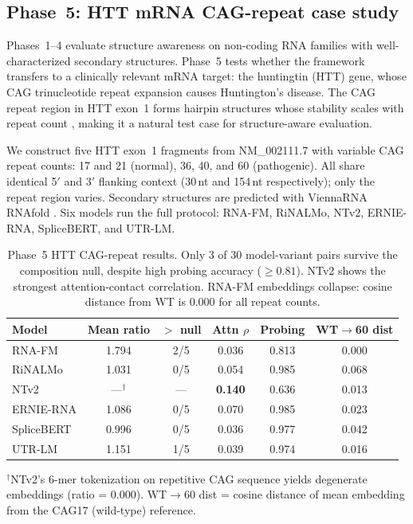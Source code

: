 \documentclass[11pt]{article}
\begin{document}
\subsection{Phase~5: HTT mRNA CAG-repeat case study}
\label{sec:phase5}

Phases~1--4 evaluate structure awareness on non-coding RNA families
with well-characterized secondary structures.  Phase~5 tests
whether the framework transfers to a clinically relevant mRNA target:
the huntingtin (HTT) gene, whose CAG trinucleotide repeat expansion
causes Huntington's disease.  The CAG repeat region in HTT exon~1
forms hairpin structures whose stability scales with repeat count
\citep{demezer2011mutant,krzyzosiak2012triplet}, making it a natural
test case for structure-aware evaluation.

We construct five HTT exon~1 fragments from NM\_002111.7 with
variable CAG repeat counts: 17 and 21 (normal), 36, 40, and 60
(pathogenic).  All share identical 5$'$ and 3$'$ flanking context
(30\,nt and 154\,nt respectively); only the repeat region varies.
Secondary structures are predicted with ViennaRNA RNAfold
\citep{lorenz2011viennarna}.  Six models run the full protocol:
RNA-FM, RiNALMo, NTv2, ERNIE-RNA, SpliceBERT, and UTR-LM.

\begin{table}[t]
\centering
\caption{Phase~5 HTT CAG-repeat results.  Only 3 of 30
  model-variant pairs survive the composition null, despite
  high probing accuracy ($\geq 0.81$).  NTv2 shows the strongest
  attention-contact correlation.  RNA-FM embeddings
  collapse: cosine distance from WT is 0.000 for all
  repeat counts.}
\label{tab:phase5}
\begin{tabular}{@{}lccccc@{}}
\toprule
\textbf{Model} & \textbf{Mean ratio} & \textbf{$>$ null} &
  \textbf{Attn $\rho$} & \textbf{Probing} &
  \textbf{WT$\to$60 dist} \\
\midrule
RNA-FM     & 1.794 & 2/5  & 0.036 & 0.813 & 0.000 \\
RiNALMo    & 1.031 & 0/5  & 0.054 & 0.985 & 0.068 \\
NTv2       & ---$^\dagger$ & ---   & \textbf{0.140} & 0.636 & 0.013 \\
ERNIE-RNA  & 1.086 & 0/5  & 0.070 & 0.985 & 0.023 \\
SpliceBERT & 0.996 & 0/5  & 0.036 & 0.977 & 0.042 \\
UTR-LM     & 1.151 & 1/5  & 0.039 & 0.974 & 0.016 \\
\bottomrule
\end{tabular}
\medskip

\small $^\dagger$NTv2's 6-mer tokenization on repetitive CAG
sequence yields degenerate embeddings (ratio = 0.000).
WT$\to$60 dist = cosine distance of mean embedding from the
CAG17 (wild-type) reference.
\end{table}
\end{document}
